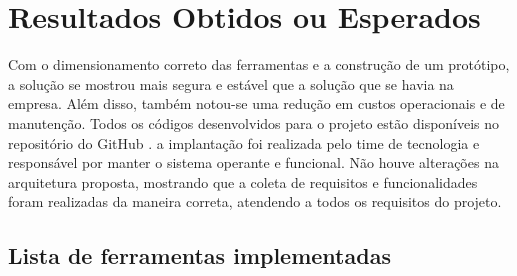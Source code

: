 \chapter{Resultados Obtidos ou Esperados}

Com o dimensionamento correto das ferramentas e a construção de um protótipo, a solução se mostrou mais segura e estável que a solução que se havia na empresa. Além disso, também notou-se uma redução em custos operacionais e de manutenção. Todos os códigos desenvolvidos para o projeto estão disponíveis no repositório do GitHub \cite{github}. a implantação foi realizada pelo time de tecnologia e responsável por manter o sistema operante e funcional. Não houve alterações na arquitetura proposta, mostrando que a coleta de requisitos e funcionalidades foram realizadas da maneira correta, atendendo a todos os requisitos do projeto.

\section{Lista de ferramentas implementadas}

